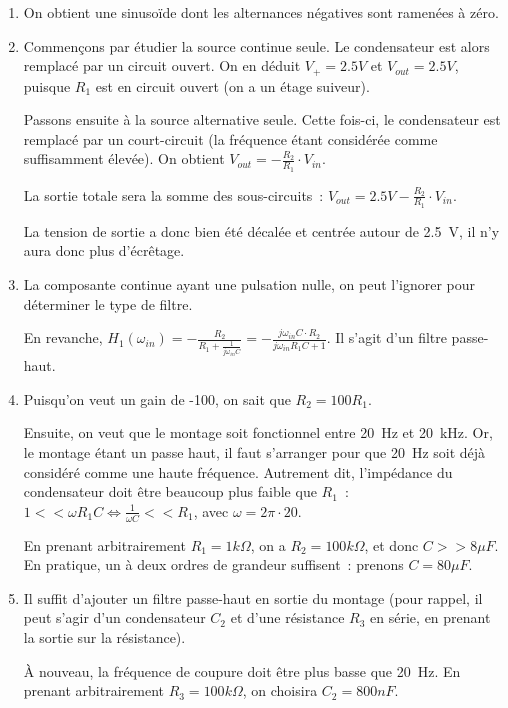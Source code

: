 \documentclass{../template/tp}
\begin{document}
{
	\begin{enumerate}
		\item On obtient une sinusoïde dont les alternances négatives sont ramenées à zéro.

		\item Commençons par étudier la source continue seule.
		Le condensateur est alors remplacé par un circuit ouvert.
		On en déduit $V_+ = 2.5V$ et $V_{out} = 2.5 V$, puisque $R_1$ est en circuit ouvert (on a un étage suiveur).

		Passons ensuite à la source alternative seule.
		Cette fois-ci, le condensateur est remplacé par un court-circuit (la fréquence étant considérée comme suffisamment élevée).
		On obtient $V_{out} = -\frac{R_2}{R_1}\cdot V_{in}$.

		La sortie totale sera la somme des sous-circuits~: $V_{out} = 2.5 V - \frac{R_2}{R_1}\cdot V_{in}$.

		La tension de sortie a donc bien été décalée et centrée autour de 2.5~V, il n'y aura donc plus d'écrêtage.

		\item La composante continue ayant une pulsation nulle, on peut l'ignorer pour déterminer le type de filtre.

		En revanche, $H_1(\omega_{in}) = - \frac{R_2}{R_1 + \frac{1}{j\omega_{in}C}} = - \frac{j\omega_{in}C \cdot R_2}{j\omega_{in}R_1C + 1}$. Il s'agit d'un filtre passe-haut.

		\item Puisqu'on veut un gain de -100, on sait que $R_2 = 100 R_1$.

		Ensuite, on veut que le montage soit fonctionnel entre 20~Hz et 20~kHz. Or, le montage étant un passe haut, il faut s'arranger pour que 20~Hz soit déjà considéré comme une haute fréquence.
		Autrement dit, l'impédance du condensateur doit être beaucoup plus faible que $R_1$~: $1 << \omega R_1C \Leftrightarrow \frac{1}{\omega C} << R_1$, avec $\omega = 2 \pi \cdot 20$.

		En prenant arbitrairement $R_1 = 1k\Omega$, on a $R_2 = 100k\Omega$, et donc $C >> 8 \mu F$.
		En pratique, un à deux ordres de grandeur suffisent~: prenons $C = 80 \mu F$.

		\item Il suffit d'ajouter un filtre passe-haut en sortie du montage (pour rappel, il peut s'agir d'un condensateur $C_2$ et d'une résistance $R_3$ en série, en prenant la sortie sur la résistance).

		À nouveau, la fréquence de coupure doit être plus basse que 20~Hz.
		En prenant arbitrairement $R_3 = 100 k\Omega$, on choisira $C_2 = 800 nF$.
	\end{enumerate}
}
\end{document}

